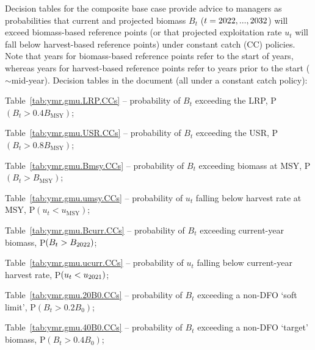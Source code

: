 \documentclass[11pt]{book}
\newcommand{\Bmsy}{B_\text{MSY}}
\newcommand{\umsy}{u_\text{MSY}}
\begin{document}
Decision tables for the composite base case provide advice to managers as probabilities that current and projected biomass $B_t$ ($t = 2022, ..., 2032$) will exceed biomass-based reference points (or that projected exploitation rate $u_t$ will fall below harvest-based reference points) under constant catch (CC) policies. Note that years for biomass-based reference points refer to the start of years, whereas years for harvest-based reference points refer to years prior to the start ($\sim$mid-year).
Decision tables in the document (all under a constant catch policy):
\begin{itemize_csas}{}{}
\item Table~\ref{tab:ymr.gmu.LRP.CCs} -- probability of $B_t$ exceeding the LRP, P$(B_t > 0.4 \Bmsy)$; %
\item Table~\ref{tab:ymr.gmu.USR.CCs} -- probability of $B_t$ exceeding the USR, P$(B_t > 0.8 \Bmsy)$; %
\item Table~\ref{tab:ymr.gmu.Bmsy.CCs} -- probability of $B_t$ exceeding biomass at MSY, P$(B_t > \Bmsy)$; %
\item Table~\ref{tab:ymr.gmu.umsy.CCs} -- probability of $u_t$ falling below harvest rate at MSY, P$(u_t < \umsy)$; %
\item Table~\ref{tab:ymr.gmu.Bcurr.CCs} -- probability of $B_t$ exceeding current-year biomass, P$(B_t > B_{2022})$; %
\item Table~\ref{tab:ymr.gmu.ucurr.CCs} -- probability of $u_t$ falling below current-year harvest rate, P$(u_t < u_{2021})$; %
\item Table~\ref{tab:ymr.gmu.20B0.CCs} -- probability of $B_t$ exceeding a non-DFO `soft limit', P$(B_t > 0.2 B_0)$; %
\item Table~\ref{tab:ymr.gmu.40B0.CCs} -- probability of $B_t$ exceeding a non-DFO `target' biomass, P$(B_t > 0.4 B_0)$; %
\end{itemize_csas}
\end{document}
